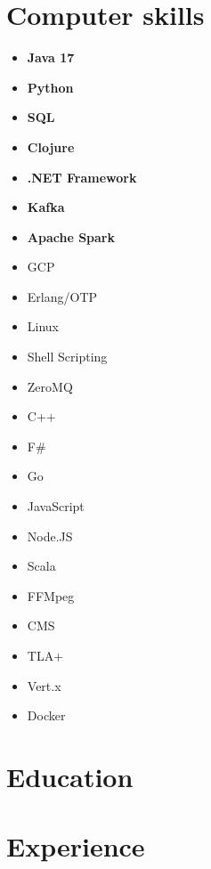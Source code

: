 \documentclass[11pt,a4paper,roman,english]{moderncv}        %
\begin{document}


\makecvtitle
\section{Computer skills}
\begin{multicols}{4}
	\begin{itemize}
		\item[] \textbf{Java 17}
		\item[] \textbf{Python}
		\item[] \textbf{SQL}
		\item[] \textbf{Clojure}
		\item[] \textbf{.NET Framework}
		\item[] \textbf{Kafka}
		\item[] \textbf{Apache Spark}
		\item[] GCP
		\item[] Erlang/OTP
		\item[] Linux
		\item[] Shell Scripting
		\item[] ZeroMQ
		\item[] C++
		\item[] F\#
		\item[] Go
		\item[] JavaScript
		\item[] Node.JS
		\item[] Scala
		\item[] FFMpeg
		\item[] CMS
        \item[] TLA+
	\item[] Vert.x
        \item[] Docker
	\end{itemize}
\end{multicols}
\section{Education}
\section{Experience}
\end{document}
